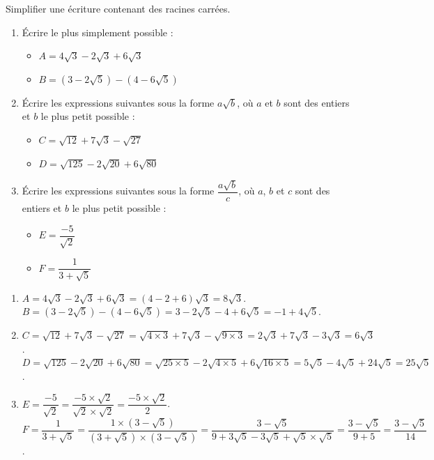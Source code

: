 \newpage

\begin{Méthode}Simplifier une écriture contenant des racines carrées. \\

\begin{enumerate}
\item Écrire le plus simplement possible : 
\begin{itemize}[label=\textcolor{Couleur3}{$\bullet$}]
\item $A=4\sqrt{3}-2\sqrt{3}+6\sqrt{3}$
\item $B=(3-2\sqrt{5})-(4-6\sqrt{5})$
\end{itemize}


\item Écrire les expressions suivantes sous la forme $a\sqrt{b}$, où $a$ et $b$ sont des entiers et $b$ le plus petit possible :
\begin{itemize}[label=\textcolor{Couleur3}{$\bullet$}]
\item $C=\sqrt{12}+7\sqrt{3}-\sqrt{27}$
\item $D=\sqrt{125}-2\sqrt{20}+6\sqrt{80}$
\end{itemize}
\item Écrire les expressions suivantes sous la forme $\dfrac{a\sqrt{b}}{c}$, où $a$, $b$ et $c$ sont des entiers et $b$ le plus petit possible :
\begin{itemize}[label=\textcolor{Couleur3}{$\bullet$}]

\item $E=\dfrac{-5}{\sqrt{2}}$
\item $F=\dfrac{1}{3+\sqrt{5}}$

\end{itemize}
\end{enumerate}


\begin{enumerate}
\item 

$A=4\sqrt{3}-2\sqrt{3}+6\sqrt{3}=(4-2+6)\sqrt{3}=8\sqrt{3}$.\\
$B=(3-2\sqrt{5})-(4-6\sqrt{5})=3-2\sqrt{5}-4+6\sqrt{5}=-1+4\sqrt{5}$.

\item 

$C=\sqrt{12}+7\sqrt{3}-\sqrt{27}=\sqrt{4\times 3}+7\sqrt{3}-\sqrt{9\times 3}=2\sqrt{ 3}+7\sqrt{3}-3\sqrt{ 3}=6\sqrt{3}$.\\
$D=\sqrt{125}-2\sqrt{20}+6\sqrt{80}=\sqrt{25\times 5}-2\sqrt{4\times 5}+6\sqrt{16\times 5}=5\sqrt{5}-4\sqrt{5}+24\sqrt{5}=25\sqrt{5}$.

\item 

$E=\dfrac{-5}{\sqrt{2}}=\dfrac{-5\times \sqrt{2}}{\sqrt{2}\times \sqrt{2}}=\dfrac{-5\times \sqrt{2}}{2}$. \\

$F=\dfrac{1}{3+\sqrt{5}}=\dfrac{1\times (3-\sqrt{5})}{(3+\sqrt{5})\times (3-\sqrt{5})}=\dfrac{3-\sqrt{5}}{9+3\sqrt{5}-3\sqrt{5}+\sqrt{5}\times \sqrt{5}}=\dfrac{3-\sqrt{5}}{9+5}=\dfrac{3-\sqrt{5}}{14}$.
\end{enumerate}


\end{Méthode}

